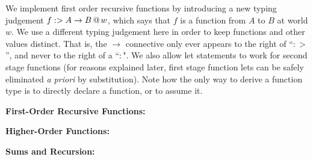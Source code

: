 \documentclass[]{article}
\begin{document}
\begin{abstrsyn}
We implement first order recursive functions by introducing a new typing judgement \mbox{${f}:>{A\to B}~\hspace{-0.15em}\text{@}\hspace{-0.2em}~{w}$},
which says that $f$ is a function from $A$ to $B$ at world $w$.  
We use a different typing judgement here in order to keep functions and other values distinct.
That is, the $\to$ connective only ever appears to the right of ``$:>$'', and never to the right of a ``$:$".
We also allow let statements to work for second stage functions 
(for reasons explained later, first stage function lets can be safely eliminated \emph{a priori} by substitution).
Note how the only way to derive a function type is to directly declare a function, or to assume it.
\begin{framed}
\noindent\textbf{First-Order Recursive Functions:}
\end{framed}

\begin{framed}
\noindent\textbf{Higher-Order Functions:}
\end{framed}

\begin{framed}
\noindent\textbf{Sums and Recursion:}
\end{framed}


\end{abstrsyn}
\end{document}

